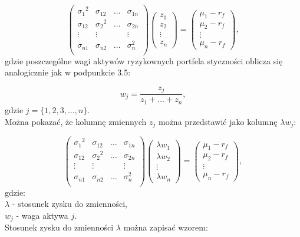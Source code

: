 \documentclass[magister]{dyplom}
\begin{document}
\begin{equation}
	\left( \begin{array}{cccc}
		{\sigma_1}^2& \sigma_{12}  & \dots & \sigma_{1n}\\
		\sigma_{12} & {\sigma_2}^2 & \dots & \sigma_{2n}\\
		\vdots 		& \vdots 	   &       & \vdots  \\
		\sigma_{n1} & \sigma_{n2}  & \dots & \sigma_{n}^2\\
	\end{array} \right)
	\left( \begin{array}{c}
		z_1\\
		z_2\\
		\vdots\\
		z_n
	\end{array} \right) =
	\left( \begin{array}{c}
		\mu_1 - r_f\\
		\mu_2 - r_f\\
		\vdots\\
		\mu_n - r_f
	\end{array} \right),
\end{equation}
gdzie poszczególne wagi aktywów ryzykownych portfela styczności oblicza się analogicznie jak w podpunkcie 3.5:

\begin{equation}
w_j = \frac{z_j}{z_1 + \dots + z_n},
\end{equation}
gdzie $j = \{1, 2, 3, \dots, n\}$.\\
Można pokazać, że kolumnę zmiennych $z_j$ można przedstawić jako kolumnę ${\lambda}w_j$:

\begin{equation}
	\left( \begin{array}{cccc}
		{\sigma_1}^2& \sigma_{12}  & \dots & \sigma_{1n}\\
		\sigma_{12} & {\sigma_2}^2 & \dots & \sigma_{2n}\\
		\vdots 		& \vdots 	   &       & \vdots  \\
		\sigma_{n1} & \sigma_{n2}  & \dots & \sigma_{n}^2\\
	\end{array} \right)
	\left( \begin{array}{c}
		{\lambda}w_1\\
		{\lambda}w_2\\
		\vdots\\
		{\lambda}w_n
	\end{array} \right) =
	\left( \begin{array}{c}
		\mu_1 - r_f\\
		\mu_2 - r_f\\
		\vdots\\
		\mu_n - r_f
	\end{array} \right),
\end{equation}
gdzie:\\ 
$\lambda$ - stosunek zysku do zmienności,\\
$w_j$ - waga aktywa $j$.\\
Stosunek zysku do zmienności $\lambda$ można zapisać wzorem:
\end{document}
